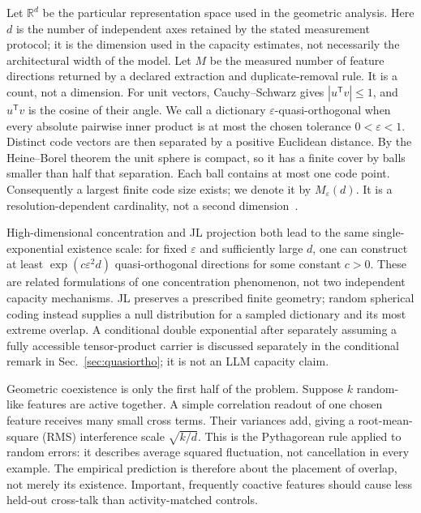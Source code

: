 \documentclass[
  aps,
  reprint,
  superscriptaddress,
  floatfix,
  nofootinbib,
  longbibliography
]{revtex4-2}
\newcommand{\R}{\mathbb{R}}
\newcommand{\Msem}{M}
\newcommand{\T}{^{\mathsf{T}}}
\begin{document}
Let $\R^d$ be the particular representation space used in the geometric
analysis.  Here $d$ is the number of independent axes retained by the stated
measurement protocol; it is the dimension used in the capacity estimates, not
necessarily the architectural width of the model.  Let $\Msem$ be the
measured number of feature directions returned by a declared extraction and
duplicate-removal rule.  It is a count, not a dimension.  For unit vectors,
Cauchy--Schwarz gives $|u\T v|\leq1$, and $u\T v$ is the cosine of their angle.
We call a dictionary $\varepsilon$-quasi-orthogonal when every absolute
pairwise inner product is at most the chosen tolerance
$0<\varepsilon<1$.  Distinct code vectors are then separated by a positive
Euclidean distance.  By the Heine--Borel theorem the unit sphere is compact,
so it has a finite cover by balls smaller than half that separation.  Each ball
contains at most one code point.  Consequently a largest finite code size
exists; we denote it by
$M_\varepsilon(d)$.  It is a resolution-dependent cardinality, not a second
dimension~\cite{kainen1993quasiorthogonal,kabatiansky1978bounds,conway1999sphere}.

High-dimensional concentration and JL projection both lead to the same
single-exponential existence scale: for fixed $\varepsilon$ and sufficiently
large $d$, one can construct at least
$\exp(c\varepsilon^2d)$ quasi-orthogonal directions for some constant $c>0$.
These are related formulations of one concentration phenomenon, not two
independent capacity mechanisms.  JL preserves a prescribed finite geometry;
random spherical coding instead supplies a null distribution for a sampled
dictionary and its most extreme overlap.  A conditional double exponential
after separately assuming a fully accessible tensor-product carrier is
discussed separately in the conditional remark in
Sec.~\ref{sec:quasiortho}; it is not an LLM capacity
claim.

Geometric coexistence is only the first half of the problem.  Suppose $k$
random-like features are active together.  A simple correlation readout of one
chosen feature receives many small cross terms.  Their variances add, giving a
root-mean-square (RMS) interference scale $\sqrt{k/d}$.  This is the
Pythagorean rule applied to random errors: it describes average squared
fluctuation, not cancellation in every example.  The empirical prediction is
therefore about the placement of overlap, not merely its existence.  Important,
frequently coactive features should cause less held-out cross-talk than
activity-matched controls.
\end{document}
